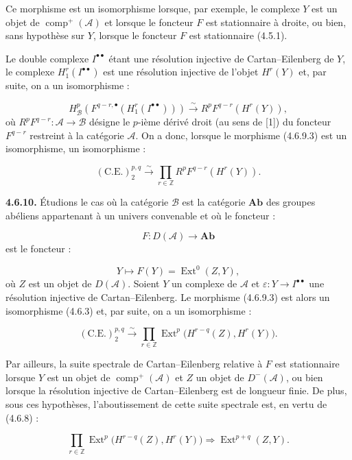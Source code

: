 \clearpage
{}%
\begingroup\small\setlength{\parskip}{0pt}\setlength{\emergencystretch}{1.5em}
\setlength{\abovedisplayskip}{4pt plus 2pt minus 2pt}%
\setlength{\belowdisplayskip}{4pt plus 2pt minus 2pt}%

\noindent Ce morphisme est un isomorphisme lorsque, par exemple, le
complexe $Y$ est un objet de $\operatorname{comp}^{+}(\mathcal A)$ et
lorsque le foncteur $F$ est stationnaire à droite, ou bien, sans hypothèse
sur $Y$, lorsque le foncteur $F$ est stationnaire (4.5.1).

Le double complexe $I^{\bullet\bullet}$ étant une résolution injective de
Cartan--Eilenberg de $Y$, le complexe
$H_1^r(I^{\bullet\bullet})$ est une résolution injective de l'objet
$H^r(Y)$ et, par suite, on a un isomorphisme :

\[
H_{\mathcal B}^{p}\left(
F^{q-r,\bullet}(H_1^r(I^{\bullet\bullet}))
\right)
\xrightarrow{\sim}
R^pF^{q-r}(H^r(Y)),
\tag{4.6.9.4}
\]
où $R^pF^{q-r}\colon\mathcal A\longrightarrow\mathcal B$ désigne le
$p$-ième dérivé droit (au sens de [1]) du foncteur $F^{q-r}$ restreint à
la catégorie $\mathcal A$. On a donc, lorsque le morphisme (4.6.9.3) est un
isomorphisme, un isomorphisme :

\[
(\mathrm{C.E.})_2^{p,q}\xrightarrow{\sim}
\prod_{r\in\mathbb Z}R^pF^{q-r}(H^r(Y)).
\tag{4.6.9.5}
\]

\medskip\noindent\textbf{4.6.10.}\quad
Étudions le cas où la catégorie $\mathcal B$ est la catégorie
$\mathbf{Ab}$ des groupes abéliens appartenant à un univers convenable et
où le foncteur :

\[
F\colon D(\mathcal A)\longrightarrow\mathbf{Ab}
\]
est le foncteur :

\[
Y\longmapsto F(Y)=\operatorname{Ext}^{0}(Z,Y),
\]
où $Z$ est un objet de $D(\mathcal A)$. Soient $Y$ un complexe de
$\mathcal A$ et
$\varepsilon\colon Y\longrightarrow I^{\bullet\bullet}$ une résolution
injective de Cartan--Eilenberg. Le morphisme (4.6.9.3) est alors un
isomorphisme (4.6.3) et, par suite, on a un isomorphisme :

\[
(\mathrm{C.E.})_2^{p,q}\xrightarrow{\sim}
\prod_{r\in\mathbb Z}
\operatorname{Ext}^{p}\bigl(H^{r-q}(Z),H^r(Y)\bigr).
\tag{4.6.10.1}
\]

Par ailleurs, la suite spectrale de Cartan--Eilenberg relative à $F$ est
stationnaire lorsque $Y$ est un objet de
$\operatorname{comp}^{+}(\mathcal A)$ et $Z$ un objet de
$D^{-}(\mathcal A)$, ou bien lorsque la résolution injective de
Cartan--Eilenberg est de longueur finie. De plus, sous ces hypothèses,
l'aboutissement de cette suite spectrale est, en vertu de (4.6.8) :

\[
\prod_{r\in\mathbb Z}
\operatorname{Ext}^{p}\bigl(H^{r-q}(Z),H^r(Y)\bigr)
\Longrightarrow
\operatorname{Ext}^{p+q}(Z,Y).
\]
\endgroup
